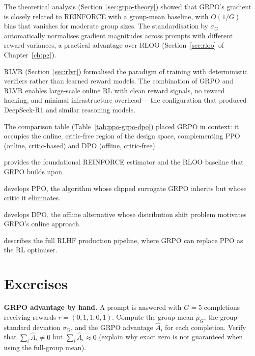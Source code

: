 The theoretical analysis (Section~\ref{sec:grpo-theory}) showed that GRPO's gradient is closely related to REINFORCE with a group-mean baseline, with $O(1/G)$ bias that vanishes for moderate group sizes.  The standardisation by $\sigma_G$ automatically normalises gradient magnitudes across prompts with different reward variances, a practical advantage over RLOO (Section~\ref{sec:rloo} of Chapter~\ref{ch:pg}).

RLVR (Section~\ref{sec:rlvr}) formalised the paradigm of training with deterministic verifiers rather than learned reward models.  The combination of GRPO and RLVR enables large-scale online RL with clean reward signals, no reward hacking, and minimal infrastructure overhead\,---\,the configuration that produced DeepSeek-R1 and similar reasoning models.

The comparison table (Table~\ref{tab:ppo-grpo-dpo}) placed GRPO in context: it occupies the online, critic-free region of the design space, complementing PPO (online, critic-based) and DPO (offline, critic-free).

\begin{description}[leftmargin=!,labelwidth=3.5cm]
  \item[Chapter~\ref{ch:pg}] provides the foundational REINFORCE estimator and the RLOO baseline that GRPO builds upon.
  \item[Chapter~\ref{ch:actor-critic}] develops PPO, the algorithm whose clipped surrogate GRPO inherits but whose critic it eliminates.
  \item[Chapter~\ref{ch:dpo}] develops DPO, the offline alternative whose distribution shift problem motivates GRPO's online approach.
  \item[Chapter~\ref{ch:practical-rlhf}] describes the full RLHF production pipeline, where GRPO can replace PPO as the RL optimiser.
\end{description}

\section*{Exercises}

\begin{exercise}
\label{ex:grpo-1}
\textbf{GRPO advantage by hand.}  A prompt is answered with $G = 5$ completions receiving rewards $r = (0, 1, 1, 0, 1)$.  Compute the group mean $\mu_G$, the group standard deviation $\sigma_G$, and the GRPO advantage $\hat{A}_i$ for each completion.  Verify that $\sum_i \hat{A}_i \neq 0$ but $\sum_i \hat{A}_i \approx 0$ (explain why exact zero is not guaranteed when using the full-group mean).
\end{exercise}


